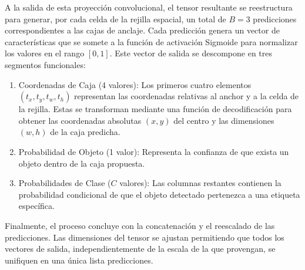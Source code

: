 \documentclass{article}
\begin{document}
	
	A la salida de esta proyección convolucional, el tensor resultante se reestructura para generar, por cada celda de la rejilla espacial, un total de $B=3$ predicciones correspondientes a las cajas de anclaje. Cada predicción genera un vector de características que se somete a la función de activación Sigmoide para normalizar los valores en el rango $[0, 1]$. Este vector de salida se descompone en tres segmentos funcionales:
	\begin{enumerate}
		\item Coordenadas de Caja (4 valores): Los primeros cuatro elementos $(t_x, t_y, t_w, t_h)$ representan las coordenadas relativas al anchor y a la celda de la rejilla. Estas se transforman mediante una función de decodificación para obtener las coordenadas absolutas $(x, y)$ del centro y las dimensiones $(w, h)$ de la caja predicha.
		\item Probabilidad de Objeto (1 valor): Representa la confianza de que exista un objeto dentro de la caja propuesta.
		\item Probabilidades de Clase ($C$ valores): Las columnas restantes contienen la probabilidad condicional de que el objeto detectado pertenezca a una etiqueta específica.
	\end{enumerate}
		
	Finalmente, el proceso concluye con la concatenación y el reescalado de las predicciones. Las dimensiones del tensor se ajustan permitiendo que todos los vectores de salida, independientemente de la escala de la que provengan, se unifiquen en una única lista predicciones.
\end{document}
